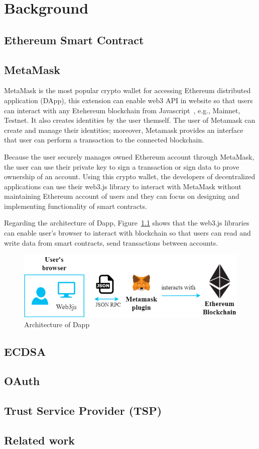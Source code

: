 \chapter{Background}
\label{chapter:background}

\section{Ethereum Smart Contract}

\newpage
\section{MetaMask}
MetaMask is the most popular crypto wallet for accessing Ethereum distributed application (DApp), this extension can enable web3 API in website so that users can interact with any Etehereum blockchain from Javascript~\cite{web3.js}, e.g., Mainnet, Testnet. It also creates identities by the user themself. The user of Metamask can create and manage their identities; moreover, Metamask provides an interface that user can perform a transaction to the connected blockchain.\par
Because the user securely  manages owned Ethereum account through MetaMask, the user can use their private key to sign a transaction or sign data to prove ownership of an account. Using this crypto wallet, the developers of decentralized applications can use their web3.js library to interact with MetaMask without maintaining Ethereum account of users and they can focus on designing and implementing functionality of smart contracts.\par
Regarding the architecture of Dapp, Figure~\ref{fig:architecture_of_dapp} shows that the web3.js libraries can enable user's browser to interact with blockchain so that users can read and write data from smart contracts, send transactions between accounts. 

\begin{figure}[hb]
    \centering
    \includegraphics[height=!,width=1\linewidth,keepaspectratio=true]{figures/architecture_of_dapp.png}
    \caption{{\footnotesize Architecture of Dapp}}
    \label{fig:architecture_of_dapp}
\end{figure}

\section{ECDSA}
\newpage
\section{OAuth}

\section{Trust Service Provider (TSP)}

\section{Related work}
